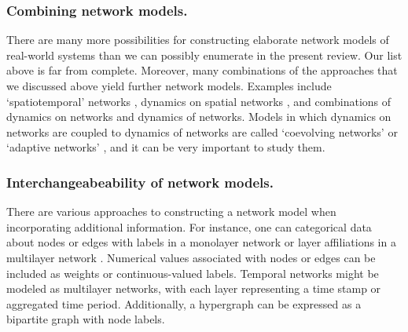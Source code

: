 \documentclass{comnet-mod}
\begin{document}
\subsubsection{Combining network models.}


There are many more possibilities for constructing elaborate network models of real-world systems than we can possibly enumerate in the present review. Our list above is far from complete. Moreover, many combinations of the approaches that we discussed above yield further network models. Examples include `spatiotemporal' networks \cite{Williams2016}, dynamics on spatial networks \cite{Danziger2014}, and combinations of dynamics on networks and dynamics of networks. Models in which dynamics on networks are coupled to dynamics of networks are called `coevolving networks' or `adaptive networks' \cite{Gross2007, Sayama2013, berner2023adaptive, sawicki2023}, and it can be very important to study them. 


\subsubsection{Interchangeabeability of network models.}

There are various approaches to constructing a network model when incorporating additional information. For instance, one can categorical data about nodes or edges with labels in a monolayer network \cite{faust1994, Light2020} or layer affiliations in a multilayer network \cite{Kivela2014}. Numerical values associated with nodes or edges can be included as weights or continuous-valued labels. Temporal networks might be modeled as multilayer networks, with each layer representing a time stamp or aggregated time period. Additionally, a hypergraph can be expressed as a bipartite graph with node labels.
\end{document}
